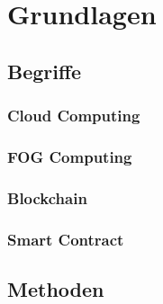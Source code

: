 \chapter{Grundlagen}
\section{Begriffe}
\subsection{Cloud Computing}
\subsection{FOG Computing}
\subsection{Blockchain}
\subsection{Smart Contract}
\section{Methoden}

